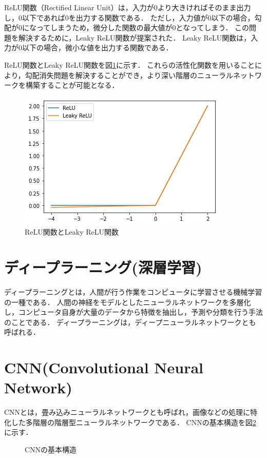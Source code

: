 \documentclass[a4j,12pt,dvipdfmx]{jreport}
\begin{document}
ReLU関数（Rectified Linear Unit）は，入力が0より大きければそのまま出力し，0以下であれば0を出力する関数である．
ただし，入力値が0以下の場合，勾配が0になってしまうため，微分した関数の最大値が0となってしまう．
この問題を解決するために，Leaky ReLU関数が提案された．
Leaky ReLU関数は，入力が0以下の場合，微小な値を出力する関数である．

ReLU関数とLeaky ReLU関数を図\ref{fig:relu}に示す．
これらの活性化関数を用いることにより，勾配消失問題を解決することができ，より深い階層のニューラルネットワークを構築することが可能となる．

\begin{figure}[b]
  \centering
  \includegraphics[width=10cm]{image/relu.png}
  \caption{ReLU関数とLeaky ReLU関数}
  \label{fig:relu}
\end{figure}

\section{ディープラーニング(深層学習)}
ディープラーニングとは，人間が行う作業をコンピュータに学習させる機械学習の一種である．
人間の神経をモデルとしたニューラルネットワークを多層化し，コンピュータ自身が大量のデータから特徴を抽出し，予測や分類を行う手法のことである．
ディープラーニングは，ディープニューラルネットワークとも呼ばれる．

\section{CNN(Convolutional Neural Network)}
CNNとは，畳み込みニューラルネットワークとも呼ばれ，画像などの処理に特化した多階層の階層型ニューラルネットワークである\cite{cnn}． 
CNNの基本構造を図\ref{fig:cnn}に示す．

\begin{figure}[t]
  \centering
  \caption{CNNの基本構造}
  \label{fig:cnn}
\end{figure}
\end{document}
